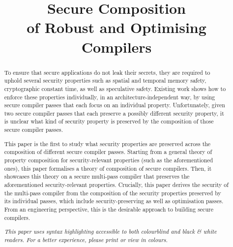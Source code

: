 \documentclass[dvipsnames,conference]{IEEEtran}
\theoremstyle{definition}
\begin{document}
\linenumbers

\title{
  Secure Composition 
  \\ 
  of Robust and Optimising Compilers
  \vspace{-1.5em}
}


\maketitle

\begin{abstract}
To ensure that secure applications do not leak their secrets, they are required to uphold several security properties such as spatial and temporal memory safety, cryptographic constant time, as well as speculative safety.
Existing work shows how to enforce these properties individually, in an architecture-independent way, by using secure compiler passes that each focus on an individual property.
Unfortunately, given two secure compiler passes that each preserve a possibly different security property, it is unclear what kind of security property is preserved by the composition of those secure compiler passes.

This paper is the first to study what security properties are preserved across the composition of different secure compiler passes.
Starting from a general theory of property composition for security-relevant properties (such as the aforementioned ones), this paper formalises a theory of composition of secure compilers.
Then, it showcases this theory on a secure multi-pass compiler that preserves the aforementioned security-relevant properties.
Crucially, this paper derives the security of the multi-pass compiler from the composition of the security properties preserved by its individual passes, which include security-preserving as well as optimisation passes.
% 
From an engineering perspective, this is the desirable approach to building secure compilers.
\begin{center}\small\it
	{This paper uses syntax highlighting accessible to both colourblind and black \& white readers.
	For a better experience, please print or view in colours.
	}
\end{center}
\end{abstract}
\end{document}
